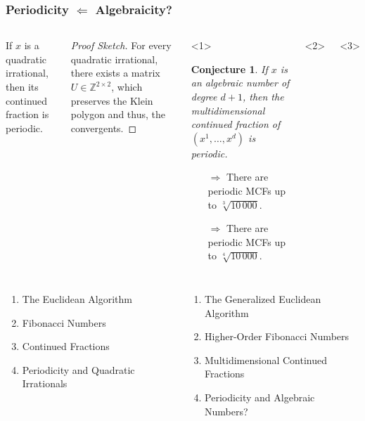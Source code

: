 \documentclass[aspectratio=169]{beamer}
\newtheorem{conjecture}{Conjecture}
\begin{document}
\begin{frame}
  \frametitle{Periodicity $\Leftarrow$ Algebraicity?}
  \small
  \begin{columns}
    \begin{theorem}
      If $x$ is a quadratic irrational,
      then its continued fraction is periodic.
    \end{theorem}

    \begin{proof}[Proof Sketch]
      For every quadratic irrational,
      there exists a matrix $U ∈ ℤ^{2×2}$, which preserves the Klein polygon and thus, the convergents.
    \end{proof}

    \begin{onlyenv}<1>
      \begin{conjecture}
        If $x$ is an algebraic number of degree $d+1$,
        then the multidimensional continued fraction of $(x^1, …, x^d)$ is
        periodic.
      \end{conjecture}

      \begin{itemize}
        \item[$\Rightarrow$] There are periodic MCFs up to $\sqrt[3]{10\,000}$.
        \item[$\Rightarrow$] There are periodic MCFs up to $\sqrt[4]{10\,000}$.
      \end{itemize}
    \end{onlyenv}
    \begin{onlyenv}<2>
    \end{onlyenv}
    \begin{onlyenv}<3>
    \end{onlyenv}
  \end{columns}
\end{frame}

\begin{frame}
  \small
  \begin{columns}
    \begin{enumerate}
      \item The Euclidean Algorithm
      \item Fibonacci Numbers
      \item Continued Fractions
      \item Periodicity and Quadratic Irrationals
    \end{enumerate}

    \begin{enumerate}
      \item The Generalized Euclidean Algorithm
      \item Higher-Order Fibonacci Numbers
      \item Multidimensional Continued Fractions
      \item Periodicity and Algebraic Numbers?
    \end{enumerate}
  \end{columns}
\end{frame}

\begin{frame}

\end{frame}
\end{document}
